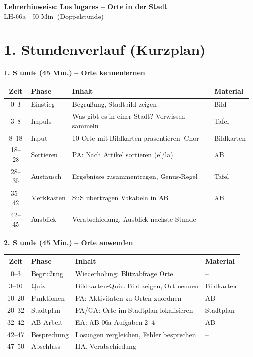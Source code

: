 \documentclass[11pt, a4paper]{article}
\newcommand{\fachfarbe}{spanisch}
\newcommand{\thema}{Los lugares -- Orte in der Stadt}
\newcommand{\sequenz}{06}
\newcommand{\block}{a}
\newcommand{\dauer}{90 Min. (Doppelstunde)}
\begin{document}
\begin{center}
    {\Large\bfseries\textcolor{\fachfarbe}{Lehrerhinweise: \thema}}\\[0.3em]
    {\normalsize LH-\sequenz\block{} | \dauer}
\end{center}

\vspace{10pt}


\section*{1. Stundenverlauf (Kurzplan)}

\textbf{1. Stunde (45 Min.) -- Orte kennenlernen}

\begin{tabularx}{\textwidth}{|c|l|X|l|}
\hline
\textbf{Zeit} & \textbf{Phase} & \textbf{Inhalt} & \textbf{Material} \\
\hline
0--3 & Einstieg & Begrußung, Stadtbild zeigen & Bild \\
\hline
3--8 & Impuls & Was gibt es in einer Stadt? Vorwissen sammeln & Tafel \\
\hline
8--18 & Input & 10 Orte mit Bildkarten prasentieren, Chor & Bildkarten \\
\hline
18--28 & Sortieren & PA: Nach Artikel sortieren (el/la) & AB \\
\hline
28--35 & Austausch & Ergebnisse zusammentragen, Genus-Regel & Tafel \\
\hline
35--42 & Merkkasten & SuS ubertragen Vokabeln in AB & AB \\
\hline
42--45 & Ausblick & Verabschiedung, Ausblick nachste Stunde & -- \\
\hline
\end{tabularx}

\vspace{1em}

\textbf{2. Stunde (45 Min.) -- Orte anwenden}

\begin{tabularx}{\textwidth}{|c|l|X|l|}
\hline
\textbf{Zeit} & \textbf{Phase} & \textbf{Inhalt} & \textbf{Material} \\
\hline
0--3 & Begrußung & Wiederholung: Blitzabfrage Orte & -- \\
\hline
3--10 & Quiz & Bildkarten-Quiz: Bild zeigen, Ort nennen & Bildkarten \\
\hline
10--20 & Funktionen & PA: Aktivitaten zu Orten zuordnen & AB \\
\hline
20--32 & Stadtplan & PA/GA: Orte im Stadtplan lokalisieren & Stadtplan \\
\hline
32--42 & AB-Arbeit & EA: AB-06a Aufgaben 2--4 & AB \\
\hline
42--47 & Besprechung & Losungen vergleichen, Fehler besprechen & -- \\
\hline
47--50 & Abschluss & HA, Verabschiedung & -- \\
\hline
\end{tabularx}
\end{document}
